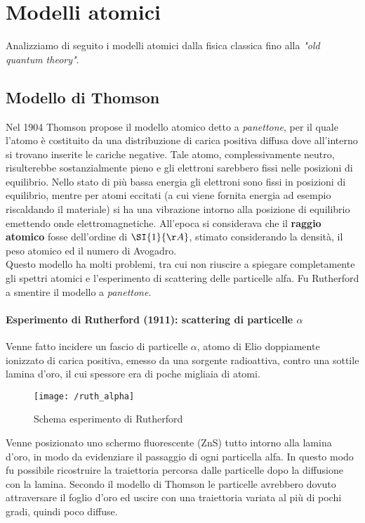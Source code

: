 

\section{Modelli atomici}
Analizziamo di seguito i modelli atomici dalla fisica classica fino alla \textit{"old quantum theory"}.


\subsection{Modello di Thomson}
Nel 1904 Thomson propose il modello atomico detto a \textit{panettone}, per il quale l'atomo è costituito da una distribuzione di carica positiva diffusa dove all'interno si trovano inserite le cariche negative.
Tale atomo, complessivamente neutro, risulterebbe sostanzialmente pieno e gli elettroni sarebbero fissi nelle posizioni di equilibrio. 
Nello stato di più bassa energia gli elettroni sono fissi in posizioni di equilibrio, mentre per atomi eccitati (a cui viene fornita energia ad esempio riscaldando il materiale) si ha una vibrazione intorno alla posizione di equilibrio emettendo onde elettromagnetiche.
All'epoca si considerava che il \textbf{raggio atomico} fosse dell'ordine di $\SI{1}{\AA}$, stimato considerando la densità, il peso atomico ed il numero di Avogadro. \\
Questo modello ha molti problemi, tra cui non riuscire a spiegare completamente gli spettri atomici e l'esperimento di scattering delle particelle alfa.
Fu Rutherford a smentire il modello a \textit{panettone}.

\paragraph{Esperimento di Rutherford (1911): scattering di particelle $\alpha$}
Venne fatto incidere un fascio di particelle $\alpha$, atomo di Elio doppiamente ionizzato di carica positiva, emesso da una sorgente radioattiva, contro una sottile lamina d'oro, il cui spessore era di poche migliaia di atomi.
\begin{figure}[h]
\centering
\texttt{[image: /ruth\_alpha]}
\caption{Schema esperimento di Rutherford}
\end{figure}
Venne posizionato uno schermo fluorescente (ZnS) tutto intorno alla lamina d'oro, in modo da evidenziare il passaggio di ogni particella alfa.
In questo modo fu possibile ricostruire la traiettoria percorsa dalle particelle dopo la diffusione con la lamina.
Secondo il modello di Thomson le particelle avrebbero dovuto attraversare il foglio d'oro ed uscire con una traiettoria variata al più di pochi gradi, quindi poco diffuse.

